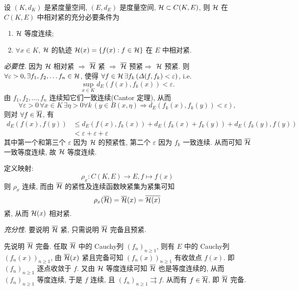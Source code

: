      \begin{Theorem}[Ascoli]
          设 $ (K, d_{K}) $ 是紧度量空间, $ (E, d_{E}) $ 是度量空间, $ \mathcal{H}\subset C(K, E) $, 则 $ \mathcal{H} $ 在 $ C(K, E) $ 中相对紧的充分必要条件为
          \begin{enumerate}[(1)]
               \item $ \mathcal{H} $ 等度连续;
               \item  $ \forall x\in K $,  $ \mathcal{H} $ 的轨迹 $ \mathcal{H}(x)=\{ f(x):f\in\mathcal{H} \} $ 在 $ E $ 中相对紧.
          \end{enumerate}
     \end{Theorem}

     \begin{Proof}
          \textsl{必要性}. 因为 $ \mathcal{H} $ 相对紧 $ \Rightarrow $ $ \overline{\mathcal{H}} $ 紧 $ \Rightarrow $ $ \overline{\mathcal{H}} $ 预紧$ \Rightarrow $ $ \mathcal{H} $ 预紧. 则 $ \forall \varepsilon>0, \exists f_{1}, f_{2}, \dots f_{n}\in\mathcal{H} $, 使得 $ \forall f\in\mathcal{H}\,\exists f_{k}\,(\varDelta(f, f_{k})<\varepsilon) $, i.e.
          \[
               \sup_{x\in K}d_{E}(f(x), f_{k}(x))<\varepsilon.   
          \]
          由 $ f_{1}, f_{2}, \dots, f_{n} $ 连续知它们一致连续(Cantor 定理), 从而 
          \[
               \forall \varepsilon>0\,\forall x\in K\,\exists\eta>0\forall k\,(y\in B(x, \eta)\Rightarrow d_{E}(f_{k}(x), f_{k}(y))<\varepsilon),
          \]
          则对 $ \forall f\in\overline{\mathcal{H}} $, 有
          \[
               \begin{aligned}
                    d_{E}(f(x), f(y)) & \leqslant d_{E}(f(x), f_{k}(x))+d_{E}(f_{k}(x)+f_{k}(y))+d_{E}(f_{k}(y), f(y))\\
                    & <\varepsilon+\varepsilon+\varepsilon
               \end{aligned}   
          \]
          其中第一个和第三个 $ \varepsilon $ 因为 $ \mathcal{H} $ 的预紧性, 第二个 $ \varepsilon $ 因为 $ f_{k} $ 一致连续. 从而可知 $ \overline{\mathcal{H}} $ 一致等度连续, 故 $ \mathcal{H} $ 等度连续.
          
          定义映射:
          \[
               \rho_{x}: C(K, E)\to E, f \mapsto f(x)
          \]
          则 $ \rho_{x} $ 连续, 而由 $ \overline{\mathcal{H}} $ 的紧性及连续函数映紧集为紧集可知
          \[
               \rho_{x}(\overline{\mathcal{H}})=\overline{\mathcal{H}}(x)=\overline{\mathcal{H}(x)}    
          \]
          紧, 从而 $ \mathcal{H}(x) $ 相对紧.

          \textsl{充分性}. 要说明 $ \overline{\mathcal{H}} $ 紧, 只需说明 $ \overline{\mathcal{H}} $ 完备且预紧.

          先说明 $ \overline{\mathcal{H}} $ 完备. 任取 $ \overline{\mathcal{H}} $ 中的 Cauchy列 $ (f_{n})_{n\geqslant1} $, 则有 $ E $ 中的 Cauchy列 $ (f_{n}(x))_{n\geqslant1} $, 由 $ \overline{\mathcal{H}}(x) $ 紧且完备可知 $ (f_{n}(x))_{n\geqslant1} $ 有收敛点 $ f(x) $. 即 $ (f_{n})_{n\geqslant1} $ 逐点收敛于 $ f $. 又由 $ \mathcal{H} $ 等度连续可知 $ \overline{\mathcal{H}} $ 也是等度连续的, 从而 $ (f_{n})_{n\geqslant1} $ 等度连续, 于是 $ f $ 连续, 且 $ (f_{n})_{n\geqslant1}\rightrightarrows f $. 从而有 $ f\in\overline{\mathcal{H}} $, 即 $ \overline{\mathcal{H}} $ 完备.


\end{Proof}
